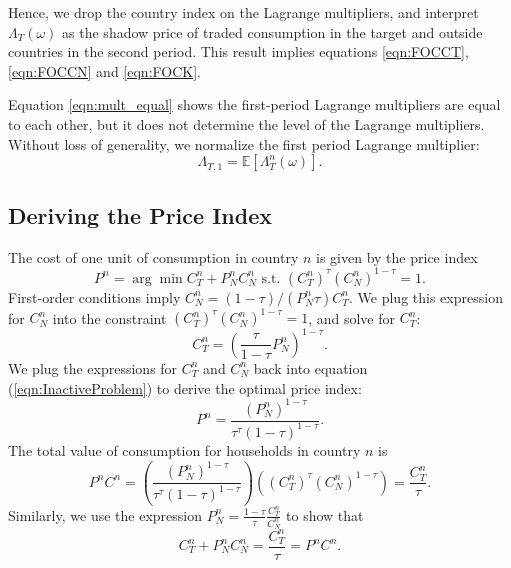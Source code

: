 Hence, we drop the country index on the Lagrange multipliers, and
interpret $\Lambda_T(\omega)$ as the shadow price of traded
consumption in the target and outside countries in the second period.
This result implies equations \eqref{eqn:FOCCT}, \eqref{eqn:FOCCN} and
\eqref{eqn:FOCK}.

Equation \eqref{eqn:mult_equal} shows the first-period Lagrange
multipliers are equal to each other, but it does not determine the
level of the Lagrange multipliers. Without loss of generality, we
normalize the first period Lagrange multiplier:
\begin{equation}
  \Lambda_{T, 1} =  \mathbb{E}\left[ \Lambda^n_T(\omega) \right].
  \label{eqn:norm_lambda}
\end{equation}


\subsection{Deriving the Price Index \label{Appendix_PriceIndex}}
The cost of one unit of consumption in country $n$ is given by the price index
\begin{equation}
  P^n = \arg \min C_T^n + P_N^n C_N^n \text{ s.t. } 
  \left( C_T^n \right)^\tau \left( C_N^n \right)^{1 - \tau} = 1.
  \label{eqn:InactiveProblem}
\end{equation}
First-order conditions imply
$C^n_N = \left( 1 - \tau \right) / \left( P^n_N \tau \right) C^n_T$. We plug
this expression for $C_N^n$ into the constraint
$\left( C_T^n \right)^\tau \left( C_N^n \right)^{1 - \tau} = 1$, and
solve for $C_T^n$:
\begin{equation*}
  C_T^n = \left( \frac{\tau}{1 - \tau} P_N^n \right)^{1 - \tau}.
\end{equation*}
We plug the expressions for $C_T^n$ and $C_N^n$ back into equation
(\ref{eqn:InactiveProblem}) to derive the optimal price index:
\begin{equation}
  P^n = \frac{ \left( P_N^n \right)^{1 - \tau}}{\tau^\tau (1 - \tau)^{1 - \tau}}.
  \label{eqn:price_index}
\end{equation}
The total value of consumption for households in country $n$ is
\begin{equation*}
  P^n C^n = 
  \left( \frac{ \left( P_N^n \right)^{1 - \tau}}{\tau^\tau (1 - \tau)^{1 - \tau}} \right)
  \left( \left( C_T^n \right)^\tau \left( C_N^n \right)^{1 - \tau} \right) = 
  \frac{C_T^n}{\tau}.
\end{equation*}
Similarly, we use the expression
$P_N^n = \frac{1 - \tau}{\tau}\frac{C_T^n}{C_N^n}$ to show that
\begin{equation*}
  C_T^n + P_N^n C_N^n = \frac{C_T^n}{\tau} = P^n C^n.
\end{equation*}

